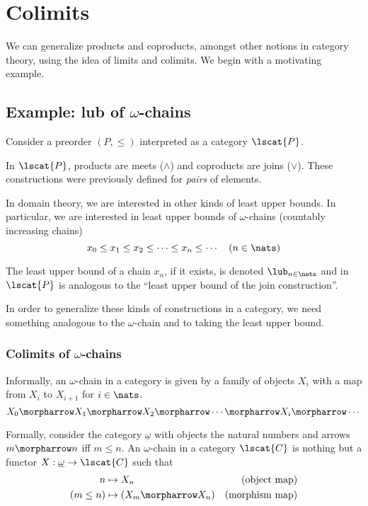 \newcommand*{\threesim}{%
\mathrel{\vcenter{\offinterlineskip
\hbox{$\sim$}\vskip-.45ex\hbox{$\sim$}\vskip-.45ex\hbox{$\sim$}}}}

\chapter{Colimits}

We can generalize products and coproducts, amongst other notions in category
theory, using the idea of limits and colimits. We begin with a motivating
example.

\section{Example: lub of $\omega$-chains}

Consider a preorder $(P, \leq)$ interpreted as a category  $\lscat{P}$.

In $\lscat{P}$,  products are meets ($\wedge$) and coproducts are joins
($\vee$). These constructions were previously defined for \emph{pairs} of
elements.

In domain theory, we are interested in other kinds of least upper bounds. In
particular, we are interested in least upper bounds of $\omega$-chains
(countably increasing chains)
\[
    x_0 \leq x_1 \leq x_2 \leq \cdots \leq x_n \leq \cdots \quad (n \in \nats)
\]

The least upper bound of a chain $x_n$, if it exists, is denoted $\lub_{n \in
\nats}$ and in $\lscat{P}$ is analogous to the ``least upper bound of the
join construction''.

In order to generalize these kinds of constructions in a category, we need
something analogous to the $\omega$-chain and to taking the least upper bound.

\subsection{Colimits of $\omega$-chains}

\begin{definition}
Informally, an $\omega$-chain in a category is given by a family of objects
$X_i$ with a map from $X_i$ to $X_{i+1}$ for $i \in \nats$.
\[
    X_0 \morpharrow X_1 \morpharrow X_2 \morpharrow \cdots \morpharrow X_i
    \morpharrow \cdots
\]

Formally, consider the category $\underline{\omega}$ with objects the natural
numbers and arrows $m \morpharrow n$ iff $m \leq n$. An $\omega$-chain in a
category $\lscat{C}$ is nothing but a functor $X : \underline{\omega} \to
\lscat{C}$ such that
\begin{align*}
    n & \mapsto X_n & (\text{object map}) \\
    (m \leq n) & \mapsto (X_m \morpharrow X_n) &(\text{morphism map})
\end{align*}

\end{definition}

